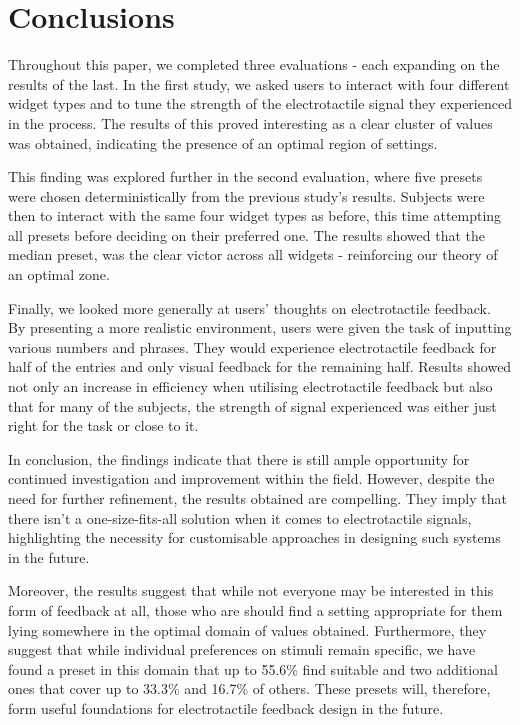 \documentclass{mpaper}
\begin{document}
\section{Conclusions}
Throughout this paper, we completed three evaluations - each expanding on the results of the last. In the first study, we asked users to interact with four different widget types and to tune the strength of the electrotactile signal they experienced in the process. The results of this proved interesting as a clear cluster of values was obtained, indicating the presence of an optimal region of settings.

This finding was explored further in the second evaluation, where five presets were chosen deterministically from the previous study's results. Subjects were then to interact with the same four widget types as before, this time attempting all presets before deciding on their preferred one. The results showed that the median preset, was the clear victor across all widgets - reinforcing our theory of an optimal zone.

Finally, we looked more generally at users' thoughts on electrotactile feedback. By presenting a more realistic environment, users were given the task of inputting various numbers and phrases. They would experience electrotactile feedback for half of the entries and only visual feedback for the remaining half. Results showed not only an increase in efficiency when utilising electrotactile feedback but also that for many of the subjects, the strength of signal experienced was either just right for the task or close to it.

In conclusion, the findings indicate that there is still ample opportunity for continued investigation and improvement within the field. However, despite the need for further refinement, the results obtained are compelling. They imply that there isn't a one-size-fits-all solution when it comes to electrotactile signals, highlighting the necessity for customisable approaches in designing such systems in the future.

Moreover, the results suggest that while not everyone may be interested in this form of feedback at all, those who are should find a setting appropriate for them lying somewhere in the optimal domain of values obtained. Furthermore, they suggest that while individual preferences on stimuli remain specific, we have found a preset in this domain that up to 55.6\% find suitable and two additional ones that cover up to 33.3\% and 16.7\% of others. These presets will, therefore, form useful foundations for electrotactile feedback design in the future.
\end{document}
